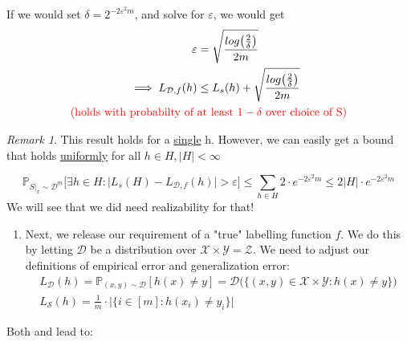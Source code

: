 \documentclass[10pt,a4paper]{article}
\theoremstyle{remark}
\newtheorem*{remark}{Remark}
\theoremstyle{definition}
\theoremstyle{plain}
\begin{document}
If we would set $\delta = 2^{-2 \varepsilon^2 m}$, and solve for $\varepsilon$, we would get
\begin{align*}
\varepsilon &= \sqrt{\frac{log\big(\frac{2}{\delta}\big)}{2m}}\\
\implies L_{\mathcal{D},f}(h) &\leq L_{s}(h) + \sqrt{\frac{log\big(\frac{2}{\delta}\big)}{2m}}\\
\text{\textcolor{red}{(holds with probabilty of }} & \text{\textcolor{red}{at least $1-\delta$ over choice of S)}}
\end{align*}

\begin{remark}
	This result holds for a \underline{single} h. However, we can easily get a bound that holds \underline{uniformly} for all $h \in H, |H| < \infty$
\end{remark}

$$ \mathbb{P}_{S|_x \sim \mathcal{D}^m} \bigg[\exists h \in H: \big|L_{s}(H) - L_{\mathcal{D}, f}(h) \big| > \varepsilon \bigg] \leq \sum_{h \in H} 2\cdot e^{-2 \varepsilon^2 m} \leq 2 \big|H\big| \cdot e^{-2 \varepsilon^2 m} $$ 
We will see that we did need realizability for that!

\begin{enumerate}
	\item[\protect\fbox{2}] Next, we release our requirement of a "true" labelling function $f$. We do this by letting $\mathcal{D}$ be a distribution over $\mathcal{X} \times \mathcal{Y} = \mathcal{Z}$. We need to adjust our definitions of empirical error and generalization error:
	\begin{eqnarray}
		L_{\mathcal{D}}(h) = 
			\mathbb{P}_{(x, y) \sim \mathcal{D}} \left[h(x) \neq y\right] = 
			\mathcal{D}\big( \{(x,y) \in \mathcal{X} \times \mathcal{Y}: h(x) \neq y\} \big)\\
		L_{\mathcal{S}}(h) = \frac{1}{m} \cdot \big| \{ i \in [m]: h(x_i) \neq y_i \} \big|	
	\end{eqnarray}
\end{enumerate}

Both \protect{} and \protect{} lead to:
\end{document}
